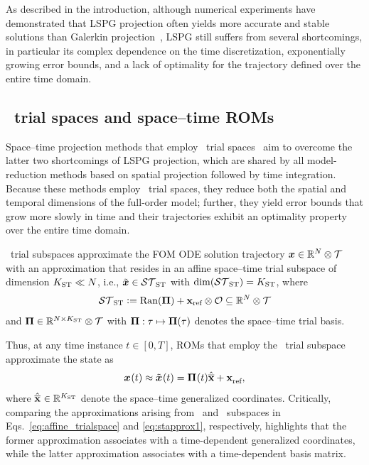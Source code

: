 \documentclass[3p,computermodern,10pt]{elsarticle}
\begin{document}
As described in the introduction, although numerical experiments have
demonstrated that LSPG projection often yields more accurate and stable
solutions than Galerkin
projection~\cite{bui_thesis,carlberg_lspg_v_galerkin,carlberg_gnat,carlberg_thesis,parish_apg},
LSPG still suffers from several shortcomings, in particular its complex
dependence on the time discretization, exponentially growing error bounds, and
a lack of optimality for the trajectory defined over the entire time domain.

\subsection{\spaceTimeAcronym\ trial spaces and space--time ROMs}

Space--time projection methods that employ \spaceTimeAcronym\ trial
spaces~\cite{choi_stlspg,constantine_strom,URBAN2012203,Yano2014ASC,benner_st,bui_thesis}
aim to overcome the latter two shortcomings of LSPG projection, which are
shared by all model-reduction methods based on spatial projection followed by
time integration.  Because these methods employ \spaceTimeAcronym\ trial
spaces, they reduce both the spatial and temporal dimensions of the full-order
model; further, they yield error bounds that grow more slowly in time and
their trajectories exhibit an optimality property over the entire time domain. 

\spaceTimeAcronym\ trial subspaces approximate the FOM ODE solution
trajectory
	${\boldsymbol x}\in\mathbb{R}^{N}\otimes \mathcal{T}$ with an approximation that resides in an
	affine space--time trial subspace of dimension $K_{\text{ST}}\ll N$, i.e., 
	$\tilde{\boldsymbol x}\in \mathcal{ ST }_{\text{ST}}$ with $\dim(\mathcal{ ST }_{\text{ST}}) =K_{\text{ST}} $, where
\begin{equation}\label{eq:sttrialspace_def}
 \mathcal{ ST }_{\text{ST}} \vcentcolon= 
	\mathrm{Ran}(\boldsymbol \Pi) + 
	\mathbf{x}_\text{ref}\otimes\mathcal{O}
	\subseteq \mathbb{R}^{N} \otimes \mathcal{T}
\end{equation}
and $\boldsymbol \Pi\in\mathbb{R}^{N \times K_{\text{ST}}}\otimes \mathcal{T}$ with 
$\boldsymbol \Pi:\tau\mapsto\boldsymbol \Pi(\tau)$
denotes the space--time trial basis.

Thus, at any time instance $t\in[0,T]$, ROMs that employ the
\spaceTimeAcronym\ trial subspace approximate the state as
\begin{equation}\label{eq:stapprox1}
 {\boldsymbol x}^{}(t) \approx \tilde{\boldsymbol x}^{}(t)  = \boldsymbol \Pi^{}(t) \hat{\mathbf{\overline{x}}} + \mathbf{x}_\text{ref}^{},
\end{equation}
where $\hat{\mathbf{\overline{x}}}^{} \in \mathbb{R}^{K_{\text{ST}}}$ denote the space--time generalized coordinates. 
Critically, comparing the approximations arising from \spatialAcronym\ and
\spaceTimeAcronym\ subspaces in Eqs.~\eqref{eq:affine_trialspace} and \eqref{eq:stapprox1}, respectively,
highlights that the former approximation associates with a time-dependent
generalized coordinates, while the latter approximation associates with a
time-dependent basis matrix.
\end{document}

